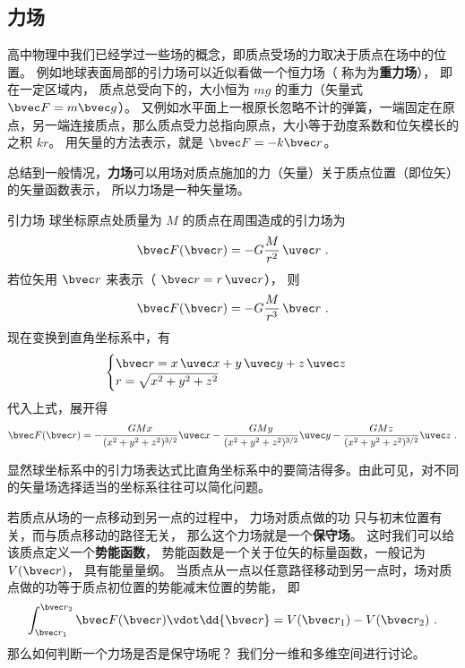 

\subsection{力场}
高中物理中我们已经学过一些场的概念，即质点受场的力取决于质点在场中的位置。 例如地球表面局部的引力场可以近似看做一个恒力场（ 称为为\textbf{重力场}）， 即在一定区域内， 质点总受向下的，大小恒为 $mg$ 的重力（矢量式 $\bvec F = m\bvec g$）。 又例如水平面上一根原长忽略不计的弹簧，一端固定在原点，另一端连接质点，那么质点受力总指向原点，大小等于劲度系数和位矢模长的之积 $kr$。 用矢量的方法表示，就是 $\bvec F = -k\bvec r$。

总结到一般情况，\textbf{力场}可以用场对质点施加的力（矢量）关于质点位置（即位矢）的矢量函数表示， 所以力场是一种矢量场。


\begin{example}{引力场}\label{V_ex1}
球坐标原点处质量为 $M$ 的质点在周围造成的引力场为
\begin{equation}
\bvec F(\bvec r) =  - G\frac{M}{r^2}\,\uvec r~.
\end{equation} 
若位矢用 $\bvec r$ 来表示（ $\bvec r = r\,\uvec r$）， 则
\begin{equation}
\bvec F(\bvec r) =  - G\frac{M}{r^3}\,\bvec r~.
\end{equation}
现在变换到直角坐标系中，有
\begin{equation}
\begin{cases}
\bvec r = x\,\uvec x + y\,\uvec y + z\,\uvec z\\
r = \sqrt{x^2 + y^2 + z^2} 
\end{cases}
\end{equation} 
代入上式，展开得
\begin{equation}
\bvec F(\bvec r) =  - \frac{GMx}{(x^2+y^2+z^2)^{3/2}}\uvec x - \frac{GMy}{(x^2 +y^2+z^2)^{3/2}}\uvec y - \frac{GMz}{(x^2+y^2+z^2)^{3/2}}\uvec z ~.
\end{equation} 

显然球坐标系中的引力场表达式比直角坐标系中的要简洁得多。由此可见，对不同的矢量场选择适当的坐标系往往可以简化问题。
\end{example}

若质点从场的一点移动到另一点的过程中， 力场对质点做的功 只与初末位置有关，而与质点移动的路径无关， 那么这个力场就是一个\textbf{保守场}。 这时我们可以给该质点定义一个\textbf{势能函数}， 势能函数是一个关于位矢的标量函数，一般记为 $V(\bvec r)$， 具有能量量纲。 当质点从一点以任意路径移动到另一点时，场对质点做的功等于质点初位置的势能减末位置的势能， 即
\begin{equation}\label{V_eq1}
\int_{\bvec r_1}^{\bvec r_2} \bvec F(\bvec r) \vdot \dd{\bvec r} = V(\bvec r_1)-V(\bvec r_2)~.
\end{equation}
那么如何判断一个力场是否是保守场呢？ 我们分一维和多维空间进行讨论。

